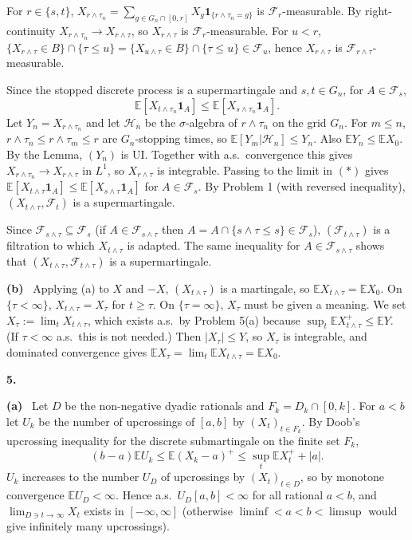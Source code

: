 \documentclass[11pt,a4paper]{article}
\newcommand{\E}{\mathbb{E}}
\newcommand{\F}{\mathcal{F}}
\newcommand{\Hc}{\mathcal{H}}
\newcommand{\1}{\mathbf{1}}
\newcommand{\prob}[1]{\par\medskip\noindent\textbf{#1}\quad}
\newcommand{\sub}[1]{\par\smallskip\noindent\textbf{#1}\ }
\begin{document}
For $r\in\{s,t\}$, $X_{r\wedge\tau_n}=\sum_{g\in G_n\cap[0,r]}X_g\1_{\{r\wedge\tau_n=g\}}$ is
$\F_r$-measurable. By right-continuity $X_{r\wedge\tau_n}\to X_{r\wedge\tau}$, so $X_{r\wedge\tau}$ is $\F_r$-measurable.
For $u<r$, $\{X_{r\wedge\tau}\in B\}\cap\{\tau\le u\}=\{X_{u\wedge\tau}\in B\}\cap\{\tau\le u\}\in\F_u$, hence
$X_{r\wedge\tau}$ is $\F_{r\wedge\tau}$-measurable.

Since the stopped discrete process is a supermartingale and $s,t\in G_n$, for $A\in\F_s$,
\[
\E[X_{t\wedge\tau_n}\1_A]\le\E[X_{s\wedge\tau_n}\1_A].\tag{$*$}
\]
Let $Y_n=X_{r\wedge\tau_n}$ and let $\Hc_n$ be the $\sigma$-algebra of $r\wedge\tau_n$ on the grid $G_n$. For $m\le n$, $r\wedge\tau_n\le
r\wedge\tau_m\le r$ are $G_n$-stopping times, so $\E[Y_m|\Hc_n]\le Y_n$. Also $\E Y_n\le\E X_0$. By the Lemma,
$(Y_n)$ is UI. Together with a.s.\ convergence this gives $X_{r\wedge\tau_n}\to X_{r\wedge\tau}$ in $L^1$, so
$X_{r\wedge\tau}$ is integrable. Passing to the limit in $(*)$ gives
$\E[X_{t\wedge\tau}\1_A]\le\E[X_{s\wedge\tau}\1_A]$ for $A\in\F_s$. By Problem 1 (with reversed inequality),
$(X_{t\wedge\tau},\F_t)$ is a supermartingale.

Since $\F_{s\wedge\tau}\subseteq\F_s$ (if $A\in\F_{s\wedge\tau}$ then $A=A\cap\{s\wedge\tau\le s\}\in\F_s$),
$(\F_{t\wedge\tau})$ is a filtration to which $X_{t\wedge\tau}$ is adapted. The same inequality for
$A\in\F_{s\wedge\tau}$ shows that $(X_{t\wedge\tau},\F_{t\wedge\tau})$ is a supermartingale.

\sub{(b)} Applying (a) to $X$ and $-X$, $(X_{t\wedge\tau})$ is a martingale, so $\E X_{t\wedge\tau}=\E X_0$.
On $\{\tau<\infty\}$, $X_{t\wedge\tau}=X_\tau$ for $t\ge\tau$. On $\{\tau=\infty\}$, $X_\tau$ must be given a meaning. We
set $X_\tau:=\lim_tX_{t\wedge\tau}$, which exists a.s.\ by Problem 5(a) because $\sup_t\E X_{t\wedge\tau}^+\le\E Y$. (If
$\tau<\infty$ a.s.\ this is not needed.) Then $|X_\tau|\le Y$, so $X_\tau$ is integrable, and dominated convergence gives
$\E X_\tau=\lim_t\E X_{t\wedge\tau}=\E X_0$.

\prob{5.}
\sub{(a)} Let $D$ be the non-negative dyadic rationals and $F_k=D_k\cap[0,k]$. For $a<b$ let
$U_k$ be the number of upcrossings of $[a,b]$ by $(X_t)_{t\in F_k}$. By Doob's upcrossing inequality for the
discrete submartingale on the finite set $F_k$,
\[(b-a)\E U_k\le\E(X_k-a)^+\le\sup_t\E X_t^++|a|.\]
$U_k$ increases to the number $U_D$ of upcrossings by $(X_t)_{t\in D}$, so by monotone convergence $\E U_D<\infty$. Hence a.s.\
$U_D[a,b]<\infty$ for all rational $a<b$, and $\lim_{D\ni t\to\infty}X_t$ exists in $[-\infty,\infty]$ (otherwise
$\liminf<a<b<\limsup$ would give infinitely many upcrossings).
\end{document}
